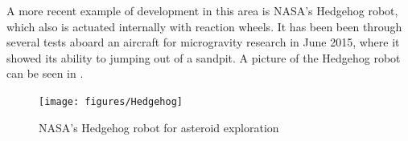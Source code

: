 %
A more recent example of development in this area is NASA's Hedgehog robot, which also is actuated internally with reaction wheels. It has been been through several tests aboard an aircraft for microgravity research in June 2015, where it showed its ability to jumping out of a sandpit. A picture of the Hedgehog robot can be seen in .
%
\begin{figure}[H] 
	\centering
	\texttt{[image: figures/Hedgehog]}
	\caption{NASA's Hedgehog robot for asteroid exploration}
	\label{Hedgehog}
\end{figure}